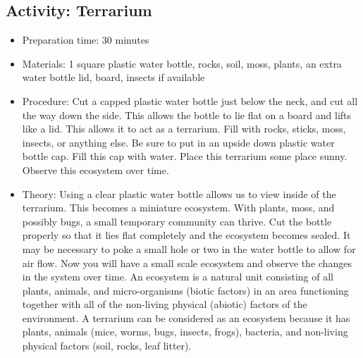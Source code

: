 \subsection{Activity: Terrarium}
\begin{itemize}
\item{Preparation time: 30 minutes}
\item{Materials: 1 square plastic water bottle, rocks, soil, moss, plants, an extra water bottle lid, board, insects if available}
\item{Procedure: Cut a capped plastic water bottle just below the neck, and cut all the way down the side. This allows the bottle to lie flat on a board and lifts like a lid. This allows it to act as a terrarium. Fill with rocks, sticks, moss, insects, or anything else. Be sure to put in an upside down plastic water bottle cap. Fill this cap with water. Place this terrarium some place sunny. Observe this ecosystem over time.}
\item{Theory: Using a clear plastic water bottle allows us to view inside of the terrarium. This becomes a miniature ecosystem. With plants, moss, and possibly bugs, a small temporary community can thrive. Cut the bottle properly so that it lies flat completely and the ecosystem becomes sealed. It may be necessary to poke a small hole or two in the water bottle to allow for air flow. Now you will have a small scale ecosystem and observe the changes in the system over time. An ecosystem is a natural unit consisting of all plants, animals, and micro-organisms (biotic factors) in an area functioning together with all of the non-living physical (abiotic) factors of the environment. A terrarium can be considered as an ecosystem because it has plants, animals (mice, worms, bugs, insects, frogs), bacteria, and non-living physical factors (soil, rocks, leaf litter).}
\end{itemize}


